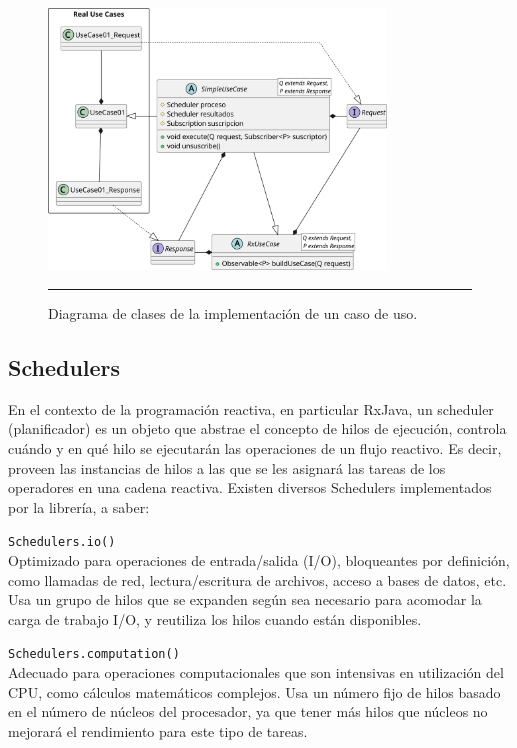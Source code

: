\begin{figure}[htbp]
	\centering
	\includegraphics[width=0.8\textwidth]{Figures/iter1/CLASS_use_cases.png}
	\rule{35em}{1pt}
	\caption[Clases del Caso de Uso]{Diagrama de clases de la implementación de un caso de uso.}
	\label{fig:class_usecases}
\end{figure}

\subsection{Schedulers}
En el contexto de la programación reactiva, en particular RxJava, un scheduler (planificador) es un objeto que abstrae el concepto de hilos de ejecución, controla cuándo y en qué hilo se ejecutarán las operaciones de un flujo reactivo. Es decir, proveen las instancias de hilos a las que se les asignará las tareas de los operadores en una cadena reactiva. Existen diversos Schedulers implementados por la librería, a saber:

\texttt{Schedulers.io()}\\
Optimizado para operaciones de entrada/salida (I/O), bloqueantes por definición, como llamadas de red, lectura/escritura de archivos, acceso a bases de datos, etc.
Usa un grupo de hilos que se expanden según sea necesario para acomodar la carga de trabajo I/O, y reutiliza los hilos cuando están disponibles.

\texttt{Schedulers.computation()}\\
Adecuado para operaciones computacionales que son intensivas en utilización del CPU, como cálculos matemáticos complejos.
Usa un número fijo de hilos basado en el número de núcleos del procesador, ya que tener más hilos que núcleos no mejorará el rendimiento para este tipo de tareas.

